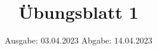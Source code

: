 

\title{Übungsblatt 1}
\date{%
  Ausgabe: 03.04.2023
  \hspace{3em}
  Abgabe: 14.04.2023
}



\maketitle
\thispagestyle{empty}
\tableofcontents
\newpage








